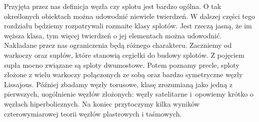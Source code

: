 
Przyjęta przez nas definicja węzła czy splotu jest bardzo ogólna.
O tak określonych obiektach można udowodnić niewiele twierdzeń.
W dalszej części tego rozdziału będziemy rozpatrywali rozmaite klasy splotów.
Jest rzeczą jasną, że im węższa klasa, tym więcej twierdzeń o jej elementach można udowodnić.
Nakładane przez nas ograniczenia będą różnego charakteru.
Zaczniemy od warkoczy oraz supłów, które stanowią cegiełki do budowy splotów.
Z pojęciem supła mocno związane są sploty dwumostowe.
Potem poznamy precle, sploty złożone z wielu warkoczy połączonych ze sobą oraz bardzo symetryczne węzły Lissajous.
Później zbadamy węzły torusowe, klasę zrozumianą jako jedną z pierwszych, uogólnienie węzłów złożonych: węzły satelitarne i~opowiemy krótko o węzłach hiperbolicznych.
Na koniec przytoczymy kilka wyników czterowymiarowej teorii węzłów plastrowych i taśmowych.

